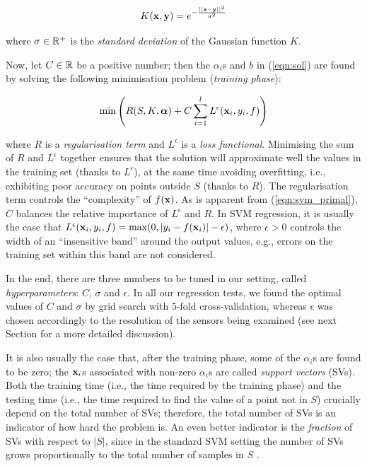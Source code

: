 \begin{equation} \label{eqn:ker}
  K(\mathbf{x},\mathbf{y}) = e^{-\frac{||\mathbf{x}-\mathbf{y}||^2}{\sigma^2}}
\end{equation}

\noindent where $\sigma \in \mathbb{R}^{+}$ is the \emph{standard deviation} of
the Gaussian function $K$.

Now, let $C \in \mathbb{R}$ be a positive number; then the $\alpha_i$s and
$b$ in (\ref{eqn:sol}) are found by solving the following minimisation
problem (\emph{training phase}):

\begin{equation} \label{eqn:svm_primal}
  \min \left( R(S,K,\boldsymbol{\alpha}) + C \sum_{i=1}^l L^\epsilon (\mathbf{x}_i,y_i,f) \right)
\end{equation}

\noindent where $R$ is a \emph{regularisation term} and
$L^\epsilon$ is a \emph{loss functional}. Minimising the sum of $R$
and $L^\epsilon$ together ensures that the solution will approximate
well the values in the training set (thanks to $L^\epsilon$), at the
same time avoiding overfitting, i.e., exhibiting poor accuracy on
points outside $S$ (thanks to $R$). The regularisation term 
controls the ``complexity'' of $f(\mathbf{x})$. As is apparent from
(\ref{eqn:svm_primal}), $C$ balances the relative importance of
$L^\epsilon$ and $R$. In SVM regression, it is usually the case that
$L^\epsilon (\mathbf{x}_i,y_i,f) = \mbox{max}(0,|y_i-f(\mathbf{x}_i)|-\epsilon)$,
where $\epsilon > 0$ controls the width of an ``insensitive band''
around the output values, e.g., errors on the training set within this
band are not considered.

In the end, there are three numbers to be tuned in our setting, called
\emph{hyperparameters}: $C$, $\sigma$ and $\epsilon$. In all our
regression tests, we found the optimal values of $C$ and $\sigma$ by
grid search with $5$-fold cross-validation, whereas $\epsilon$ was
chosen accordingly to the resolution of the sensors being examined
(see next Section for a more detailed discussion).

It is also usually the case that, after the training phase, some of
the $\alpha_i$s are found to be zero; the $\mathbf{x}_i$s associated with
non-zero $\alpha_i$s are called \emph{support vectors} (SVs). Both the
training time (i.e., the time required by the training phase) and the
testing time (i.e., the time required to find the value of a point not
in $S$) crucially depend on the total number of SVs; therefore, the
total number of SVs is an indicator of how hard the problem is. An
even better indicator is the \emph{fraction} of SVs with respect to
$|S|$, since in the standard SVM setting the number of SVs grows
proportionally to the total number of samples in $S$
\cite{Steinwart03}.

